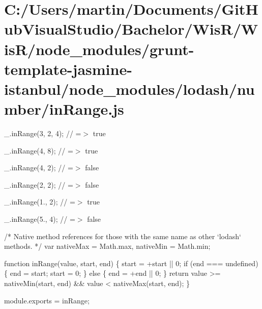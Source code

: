 \hypertarget{_c_1_2_users_2martin_2_documents_2_git_hub_visual_studio_2_bachelor_2_wis_r_2_wis_r_2node_module84204292335ee661378a8223fdda174d}{}\section{C\+:/\+Users/martin/\+Documents/\+Git\+Hub\+Visual\+Studio/\+Bachelor/\+Wis\+R/\+Wis\+R/node\+\_\+modules/grunt-\/template-\/jasmine-\/istanbul/node\+\_\+modules/lodash/number/in\+Range.\+js}
\+\_\+.\+in\+Range(3, 2, 4); // =$>$ true

\+\_\+.\+in\+Range(4, 8); // =$>$ true

\+\_\+.\+in\+Range(4, 2); // =$>$ false

\+\_\+.\+in\+Range(2, 2); // =$>$ false

\+\_\+.\+in\+Range(1., 2); // =$>$ true

\+\_\+.\+in\+Range(5., 4); // =$>$ false


\begin{DoxyCodeInclude}
\textcolor{comment}{/* Native method references for those with the same name as other `lodash` methods. */}
var nativeMax = Math.max,
    nativeMin = Math.min;

\textcolor{keyword}{function} inRange(value, start, end) \{
  start = +start || 0;
  \textcolor{keywordflow}{if} (end === undefined) \{
    end = start;
    start = 0;
  \} \textcolor{keywordflow}{else} \{
    end = +end || 0;
  \}
  \textcolor{keywordflow}{return} value >= nativeMin(start, end) && value < nativeMax(start, end);
\}

module.exports = inRange;
\end{DoxyCodeInclude}
 
